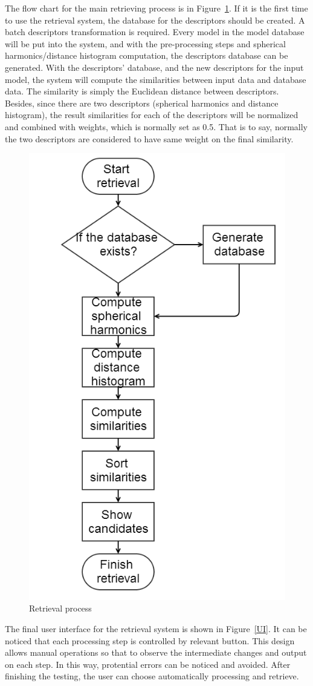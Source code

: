 The flow chart for the main retrieving process is in Figure~\ref{scan2search_main}. If it is the first time to use the retrieval system, the database for the descriptors should be created. A batch descriptors transformation is required. Every model in the model database will be put into the system, and with the pre-processing steps and spherical harmonics/distance histogram computation, the descriptors database can be generated. With the descriptors' database, and the new descriptors for the input model, the system will compute the similarities between input data and database data. The similarity is simply the Euclidean distance between
descriptors. Besides, since there are two descriptors (spherical harmonics and distance histogram), the result similarities for each of the descriptors will be normalized and combined with weights, which is normally set as 0.5. That is to say, normally the two descriptors are considered to have same weight on the final similarity.

\begin{figure}[h]
\centering
\includegraphics[width=0.4\linewidth]{scan2search_main}
\caption{Retrieval process} \label{scan2search_main}
\end{figure}

The final user interface for the retrieval system is shown in Figure~\ref{UI}. It can be noticed that each processing step is controlled by relevant button. This design allows manual operations so that to observe the intermediate changes and output on each step. In this way, protential errors can be noticed and avoided. After finishing the testing, the user can choose automatically processing and retrieve.

